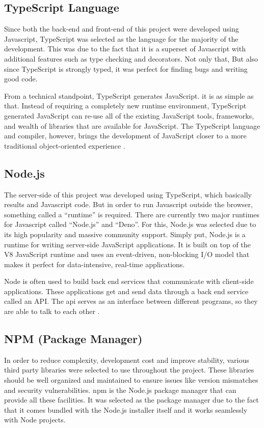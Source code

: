 \documentclass[12pt]{report}
\begin{document}
\subsection{TypeScript Language}
Since both the back-end and front-end of this project were developed using Javascript, TypeScript was selected as the language for the majority of the development. This was due to the fact that it is a superset of Javascript with additional features such as type checking and decorators. Not only that, But also since TypeScript is strongly typed, it was perfect for finding bugs and writing good code.

From a technical standpoint, TypeScript generates JavaScript. it is as simple as that. Instead of requiring a completely new runtime environment, TypeScript generated JavaScript can re-use all of the existing JavaScript tools, frameworks, and wealth of libraries that are available for JavaScript. The TypeScript language and compiler, however, brings the development of JavaScript closer to a more traditional object-oriented experience \cite{rozentals_2015_typescript}.

\subsection{Node.js}
The server-side of this project was developed using TypeScript, which basically results and Javascript code. But in order to run Javascript outside the browser, something called a ``runtime'' is required. There are currently two major runtimes for Javascript called ``Node.js'' and ``Deno''. For this, Node.js was selected due to its high popularity and massive community support. Simply put, Node.js is a runtime for writing server-side JavaScript applications. It is built on top of the V8 JavaScript runtime and uses an event-driven, non-blocking I/O model that makes it perfect for data-intensive, real-time applications.

Node is often used to build back end services that communicate with client-side applications. These applications get and send data through a back end service called an API. The \acrshort{api} serves as an interface between different programs, so they are able to talk to each other \cite{teixeira_2013_nodejs}.

\subsection{NPM (Package Manager)}
In order to reduce complexity, development cost and improve stability, various third party libraries were selected to use throughout the project. These libraries should be well organized and maintained to ensure issues like version mismatches and security vulnerabilities. \acrshort{npm} is the Node.js package manager that can provide all these facilities. It was selected as the package manager due to the fact that it comes bundled with the Node.js installer itself and it works seamlessly with Node projects.
\end{document}
